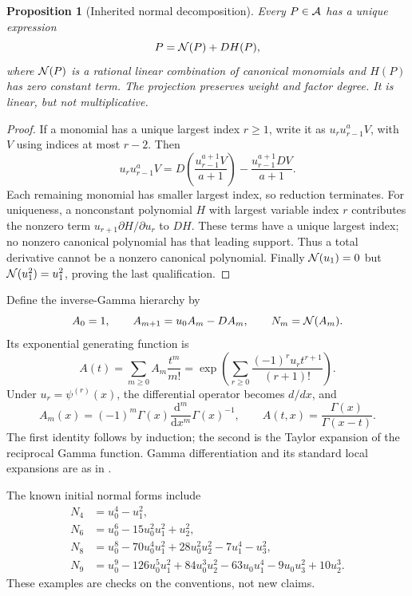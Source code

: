 \documentclass[11pt]{article}
\numberwithin{equation}{section}
\newtheorem{proposition}[theorem]{Proposition}
\theoremstyle{definition}\newtheorem{definition}[theorem]{Definition}
\theoremstyle{remark}\newtheorem{remark}[theorem]{Remark}
\begin{document}
\begin{proposition}[Inherited normal decomposition]\label{normal}
Every $P\in\mathcal A$ has a unique expression
\[
 P=\mathcal N(P)+DH(P),
\]
where $\mathcal N(P)$ is a rational linear combination of canonical monomials and $H(P)$ has zero constant term. The projection preserves weight and factor degree. It is linear, but not multiplicative.
\end{proposition}
\begin{proof}
If a monomial has a unique largest index $r\ge1$, write it as $u_ru_{r-1}^aV$, with $V$ using indices at most $r-2$. Then
\begin{equation}\label{step}
 u_ru_{r-1}^aV
 =D\left(\frac{u_{r-1}^{a+1}V}{a+1}\right)
 -\frac{u_{r-1}^{a+1}DV}{a+1}.
\end{equation}
Each remaining monomial has smaller largest index, so reduction terminates. For uniqueness, a nonconstant polynomial $H$ with largest variable index $r$ contributes the nonzero term $u_{r+1}\partial H/\partial u_r$ to $DH$. These terms have a unique largest index; no nonzero canonical polynomial has that leading support. Thus a total derivative cannot be a nonzero canonical polynomial. Finally $\mathcal N(u_1)=0$ but $\mathcal N(u_1^2)=u_1^2$, proving the last qualification.
\end{proof}
Define the inverse-Gamma hierarchy by
\begin{equation}\label{hierarchy}
 A_0=1,\qquad A_{m+1}=u_0A_m-DA_m,
 \qquad N_m=\mathcal N(A_m).
\end{equation}
Its exponential generating function is
\begin{equation}\label{bell}
 A(t)=\sum_{m\ge0}A_m\frac{t^m}{m!}
 =\exp\left(\sum_{r\ge0}\frac{(-1)^ru_rt^{r+1}}{(r+1)!}\right).
\end{equation}
Under $u_r=\psi^{(r)}(x)$, the differential operator becomes $d/dx$, and
\begin{equation}\label{gamma}
 A_m(x)=(-1)^m\Gamma(x)\frac{\mathrm d^m}{\mathrm dx^m}\Gamma(x)^{-1},
 \qquad A(t,x)=\frac{\Gamma(x)}{\Gamma(x-t)}.
\end{equation}
The first identity follows by induction; the second is the Taylor expansion of the reciprocal Gamma function. Gamma differentiation and its standard local expansions are as in \cite{dlmf}.

The known initial normal forms include
\begin{align*}
N_4&=u_0^4-u_1^2,\\
N_6&=u_0^6-15u_0^2u_1^2+u_2^2,\\
N_8&=u_0^8-70u_0^4u_1^2+28u_0^2u_2^2-7u_1^4-u_3^2,\\
N_9&=u_0^9-126u_0^5u_1^2+84u_0^3u_2^2
       -63u_0u_1^4-9u_0u_3^2+10u_2^3.
\end{align*}
These examples are checks on the conventions, not new claims.
\end{document}
